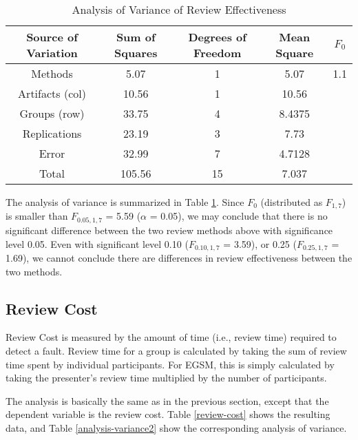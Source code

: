 \begin{table}[tb]
\begin{center}
\begin{tabular}{|c|c|c|c|c|}
\hline
Source of Variation & Sum of Squares & Degrees of Freedom & Mean Square & $F_0$\\
\hline
Methods        &  5.07   & 1    & 5.07 & 1.1\\
Artifacts (col) &  10.56   & 1   & 10.56  &  \\
Groups (row)    &  33.75   & 4    & 8.4375 &  \\
Replications    &  23.19      & 3    & 7.73     &  \\
Error             & 32.99     & 7   & 4.7128 &  \\
Total             & 105.56   & 15   & 7.037      &  \\
\hline
\end{tabular}
\end{center}
\caption{Analysis of Variance of Review Effectiveness}
\label{analysis-variance1}
\end{table}


The analysis of variance is summarized in Table \ref{analysis-variance1}.
Since $F_0$ (distributed as $F_{1,7}$) is smaller than
$F_{0.05,1,7}$ = 5.59 ($\alpha$ = 0.05),
we may conclude that there is no 
significant difference between the two review methods above with
significance level 0.05. Even with significant level 0.10 
($F_{0.10,1,7}$ = 3.59),  or 0.25 ($F_{0.25,1,7}$ = 1.69), we cannot
conclude there are differences in review effectiveness between the two
methods. 

\subsection{Review Cost}
Review Cost is measured by the amount of time (i.e., review time)
required to detect a fault. Review time for a group is calculated
by taking the 
sum of review time spent by individual participants. For EGSM, this
is simply calculated by taking the presenter's review time multiplied
by the number of participants. 

The analysis is basically the same as in the previous section, except
that the dependent variable is the review cost. Table
\ref{review-cost} shows the resulting data, and Table
\ref{analysis-variance2} show the corresponding analysis of variance.


